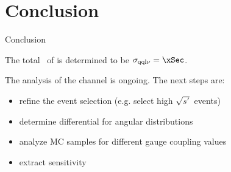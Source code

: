 
\section{Conclusion}

\begin{frame}{Conclusion}

The total \xsec\ of \eeto\qqln is determined to be $\sigma_\mathrm{\qqln} = \xSec$.

\vspace{1em}

The analysis of the \eeto\qqln channel is ongoing. The next steps are:
\begin{itemize}
\item refine the event selection (e.g. select high $\sqrt{s'}$ events)
\item determine differential  for angular distributions
\item analyze MC samples for different gauge coupling values
\item extract sensitivity
\end{itemize}



\vspace{1em}


\end{frame}
